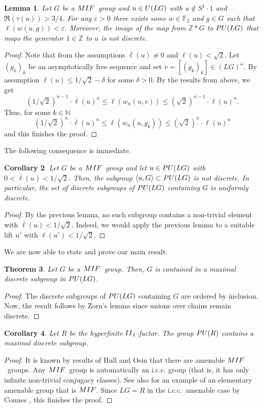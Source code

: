 \documentclass[11pt]{amsproc}
\theoremstyle{plain}
\newtheorem{theorem}{Theorem}[section]
\newtheorem{lemma}[theorem]{Lemma}
\newtheorem{corollary}[theorem]{Corollary}
\theoremstyle{remark}
\begin{document}
\begin{lemma}
Let $G$ be a ${\rm MIF}$~group and $u \in {\rm U}(LG)$ with $u \not \in S^1 \cdot 1$ and $\Re(\tau(u))>3/4$. For any $\varepsilon>0$ there exists some $w \in \mathbb F_2$ and $g \in G$ such that $\ell(w(u,g))< \varepsilon$. Moreover, the image of the map from $\mathbb Z \ast G$ to ${\rm PU}(LG)$ that maps the generator $1 \in \mathbb Z$ to $u$ is not discrete.
\end{lemma}
\begin{proof}
Note that from the assumptions $\bar \ell(u) \neq 0$ and $\ell(u)< \sqrt{2}$.
Let $(g_k)_k$ be an asymptotically free sequence and set $v= [(g_k)_k] \in (LG)^{\omega}$. By assumption $\ell(u) \leq 1/\sqrt{2} - \delta$ for some $\delta>0$. By the results from above, we get
$$(1/\sqrt{2})^{n-1} \cdot \bar\ell(u)^n \leq \ell(w_n(u,v)) \leq(\sqrt{2})^{n-1} \cdot \ell(u)^n.$$
Thus, for some $k \in \mathbb N$
$$(1/\sqrt{2})^{n} \cdot \bar\ell(u)^n \leq \ell(w_n(u,g_k)) \leq (\sqrt{2})^{n} \cdot \ell(u)^n$$
and this finishes the proof.
\end{proof}

The following consequence is immediate.
\begin{corollary}
Let $G$ be a ${\rm MIF}$~group and let $u \in {\rm PU}(LG)$ with $0 < \bar \ell(u) < 1/\sqrt{2}$. Then, the subgroup $\langle u, G \rangle \subset {\rm PU}(LG)$ is not discrete.
In particular, the set of discrete subgroups of ${\rm PU}(LG)$ containing $G$ is uniformly discrete.
\end{corollary}
\begin{proof} By the previous lemma, no such subgroup contains a non-trivial element with $\bar \ell(u)<1/\sqrt{2}$. Indeed, we would apply the previous lemma to a suitable lift $u'$ with $\ell(u')< 1/\sqrt{2}$.\end{proof}

We are now able to state and prove our main result.
\begin{theorem} \label{main}
Let $G$ be a ${\rm MIF}$~group. Then, $G$ is contained in a maximal discrete subgroup in ${\rm PU}(LG)$. 
\end{theorem}
\begin{proof}
The discrete subgroups of ${\rm PU}(LG)$ containing $G$ are ordered by inclusion.   Now, the result follows by Zorn's lemma since unions over chains remain discrete.
\end{proof}

\begin{corollary}
Let $R$ be the hyperfinite ${\rm II}_1$-factor. The group ${\rm PU}(R)$ contains a maximal discrete subgroup.
\end{corollary}
\begin{proof}
It is known by results of Hull and Osin \cite{MR3556970} that there are amenable ${\rm MIF}$~groups. Any ${\rm MIF}$~group is automatically an i.c.c. group (that is, it has only infinite non-trivial conjugacy classes). See also \cite{MR4193626} for an example of an elementary amenable group that is ${\rm MIF}$. Since $LG=R$ in the i.c.c.\ amenable case by Connes \cite{MR454659}, this finishes the proof.
\end{proof}
\end{document}
